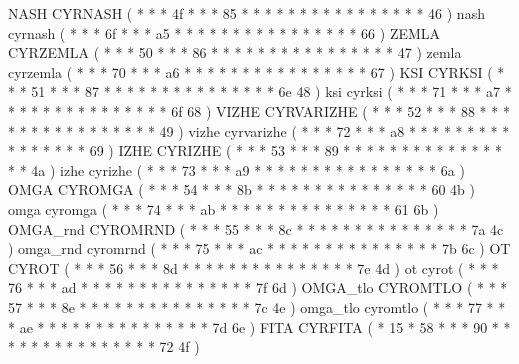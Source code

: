 \makechr NASH         CYRNASH           ( *  *       *  4f  *  *  *  85    *  *  *  *  *     *  *  *  *     *  *  *     *   *  *    *  46  )
\makechr nash         cyrnash           ( *  *       *  6f  *  *  *  a5    *  *  *  *  *     *  *  *  *     *  *  *     *   *  *    *  66  )
\makeCOD ZEMLA        CYRZEMLA          ( *  *       *  50  *  *  *  86    *  *  *  *  *     *  *  *  *     *  *  *     *   *  *    *  47  )
\makecod zemla        cyrzemla          ( *  *       *  70  *  *  *  a6    *  *  *  *  *     *  *  *  *     *  *  *     *   *  *    *  67  )
\makeCOD KSI          CYRKSI            ( *  *       *  51  *  *  *  87    *  *  *  *  *     *  *  *  *     *  *  *     *   *  *    6e 48  )
\makecod ksi          cyrksi            ( *  *       *  71  *  *  *  a7    *  *  *  *  *     *  *  *  *     *  *  *     *   *  *    6f 68  )
\makeCOD VIZHE        CYRVARIZHE        ( *  *       *  52  *  *  *  88    *  *  *  *  *     *  *  *  *     *  *  *     *   *  *    *  49  )%
\makecod vizhe        cyrvarizhe        ( *  *       *  72  *  *  *  a8    *  *  *  *  *     *  *  *  *     *  *  *     *   *  *    *  69  )
\makeCOD IZHE         CYRIZHE           ( *  *       *  53  *  *  *  89    *  *  *  *  *     *  *  *  *     *  *  *     *   *  *    *  4a  )
\makecod izhe         cyrizhe           ( *  *       *  73  *  *  *  a9    *  *  *  *  *     *  *  *  *     *  *  *     *   *  *    *  6a  )
\makeCOD OMGA         CYROMGA           ( *  *       *  54  *  *  *  8b    *  *  *  *  *     *  *  *  *     *  *  *     *   *  *    60 4b  )
\makecod omga         cyromga           ( *  *       *  74  *  *  *  ab    *  *  *  *  *     *  *  *  *     *  *  *     *   *  *    61 6b  )
\makeCOD OMGA_rnd     CYROMRND          ( *  *       *  55  *  *  *  8c    *  *  *  *  *     *  *  *  *     *  *  *     *   *  *    7a 4c  )
\makecod omga_rnd     cyromrnd          ( *  *       *  75  *  *  *  ac    *  *  *  *  *     *  *  *  *     *  *  *     *   *  *    7b 6c  )
\makeCOD OT           CYROT             ( *  *       *  56  *  *  *  8d    *  *  *  *  *     *  *  *  *     *  *  *     *   *  *    7e 4d  )
\makecod ot           cyrot             ( *  *       *  76  *  *  *  ad    *  *  *  *  *     *  *  *  *     *  *  *     *   *  *    7f 6d  )
\makeCOD OMGA_tlo     CYROMTLO          ( *  *       *  57  *  *  *  8e    *  *  *  *  *     *  *  *  *     *  *  *     *   *  *    7c 4e  )
\makecod omga_tlo     cyromtlo          ( *  *       *  77  *  *  *  ae    *  *  *  *  *     *  *  *  *     *  *  *     *   *  *    7d 6e  )
\makeCOD FITA         CYRFITA           ( *  15      *  58  *  *  *  90    *  *  *  *  *     *  *  *  *     *  *  *     *   *  *    72 4f  )
